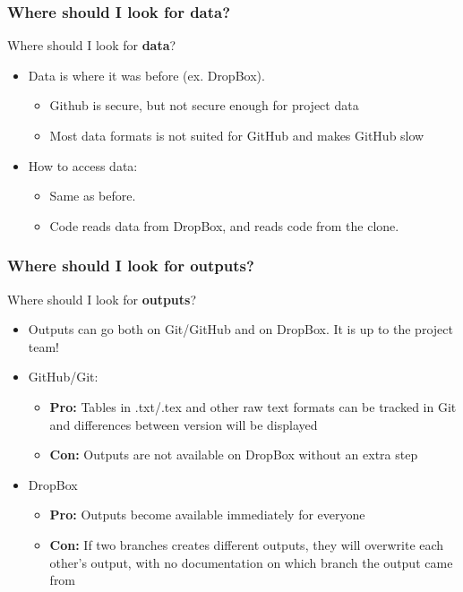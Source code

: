 \documentclass[aspectratio=169]{beamer} %
\begin{document}
\begin{frame}
	\frametitle{Where should I look for data?}

	Where should I look for \textbf{data}?

	\begin{itemize}
		\item Data is where it was before (ex. DropBox).
		\begin{itemize}
			\item Github is secure, but not secure enough for project data
			\item Most data formats is not suited for GitHub and makes GitHub slow
		\end{itemize}
		\item How to access data:
		\begin{itemize}
			\item Same as before.
			\item Code reads data from DropBox, and reads code from the clone.
		\end{itemize}
	\end{itemize}
\end{frame}

\begin{frame}
	\frametitle{Where should I look for outputs?}

	Where should I look for \textbf{outputs}?

	\begin{itemize}
		\item Outputs can go both on Git/GitHub and on DropBox. It is up to the project team!
		\item GitHub/Git:
		\begin{itemize}
			\item \textbf{Pro:} Tables in .txt/.tex and other raw text formats can be tracked in Git and differences between version will be displayed
			\item \textbf{Con:} Outputs are not available on DropBox without an extra step
		\end{itemize}
		\item DropBox
		\begin{itemize}
			\item \textbf{Pro:} Outputs become available immediately for everyone
			\item \textbf{Con:} If two branches creates different outputs, they will overwrite each other's output, with no documentation on which branch the output came from
		\end{itemize}
	\end{itemize}
\end{frame}
\end{document}

